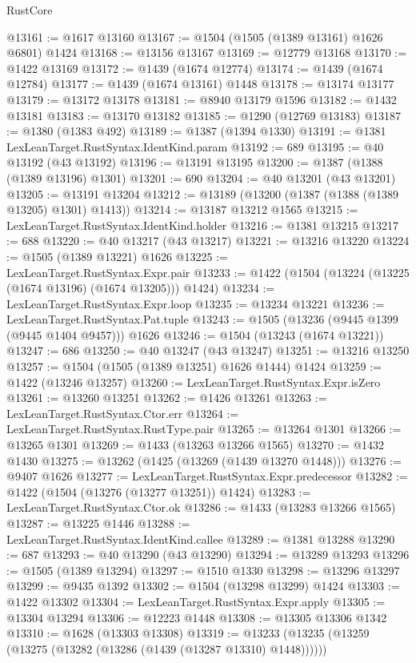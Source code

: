 \begin{lexlean}{RustCore}
\begin{coremodule}
@13161 := @1617 @13160
@13167 := @1504 (@1505 (@1389 @13161) @1626 @6801) @1424
@13168 := @13156 @13167
@13169 := @12779 @13168
@13170 := @1422 @13169
@13172 := @1439 (@1674 @12774)
@13174 := @1439 (@1674 @12784)
@13177 := @1439 (@1674 @13161) @1448
@13178 := @13174 @13177
@13179 := @13172 @13178
@13181 := @8940 @13179 @1596
@13182 := @1432 @13181
@13183 := @13170 @13182
@13185 := @1290 (@12769 @13183)
@13187 := @1380 (@1383 @492)
@13189 := @1387 (@1394 @1330)
@13191 := @1381 LexLeanTarget.RustSyntax.IdentKind.param
@13192 := 689
@13195 := @40 @13192 (@43 @13192)
@13196 := @13191 @13195
@13200 := @1387 (@1388 (@1389 @13196) @1301)
@13201 := 690
@13204 := @40 @13201 (@43 @13201)
@13205 := @13191 @13204
@13212 := @13189 (@13200 (@1387 (@1388 (@1389 @13205) @1301) @1413))
@13214 := @13187 @13212 @1565
@13215 := LexLeanTarget.RustSyntax.IdentKind.holder
@13216 := @1381 @13215
@13217 := 688
@13220 := @40 @13217 (@43 @13217)
@13221 := @13216 @13220
@13224 := @1505 (@1389 @13221) @1626
@13225 := LexLeanTarget.RustSyntax.Expr.pair
@13233 := @1422 (@1504 (@13224 (@13225 (@1674 @13196) (@1674 @13205))) @1424)
@13234 := LexLeanTarget.RustSyntax.Expr.loop
@13235 := @13234 @13221
@13236 := LexLeanTarget.RustSyntax.Pat.tuple
@13243 := @1505 (@13236 (@9445 @1399 (@9445 @1404 @9457))) @1626
@13246 := @1504 (@13243 (@1674 @13221))
@13247 := 686
@13250 := @40 @13247 (@43 @13247)
@13251 := @13216 @13250
@13257 := @1504 (@1505 (@1389 @13251) @1626 @1444) @1424
@13259 := @1422 (@13246 @13257)
@13260 := LexLeanTarget.RustSyntax.Expr.isZero
@13261 := @13260 @13251
@13262 := @1426 @13261
@13263 := LexLeanTarget.RustSyntax.Ctor.err
@13264 := LexLeanTarget.RustSyntax.RustType.pair
@13265 := @13264 @1301
@13266 := @13265 @1301
@13269 := @1433 (@13263 @13266 @1565)
@13270 := @1432 @1430
@13275 := @13262 (@1425 (@13269 (@1439 @13270 @1448)))
@13276 := @9407 @1626
@13277 := LexLeanTarget.RustSyntax.Expr.predecessor
@13282 := @1422 (@1504 (@13276 (@13277 @13251)) @1424)
@13283 := LexLeanTarget.RustSyntax.Ctor.ok
@13286 := @1433 (@13283 @13266 @1565)
@13287 := @13225 @1446
@13288 := LexLeanTarget.RustSyntax.IdentKind.callee
@13289 := @1381 @13288
@13290 := 687
@13293 := @40 @13290 (@43 @13290)
@13294 := @13289 @13293
@13296 := @1505 (@1389 @13294)
@13297 := @1510 @1330
@13298 := @13296 @13297
@13299 := @9435 @1392
@13302 := @1504 (@13298 @13299) @1424
@13303 := @1422 @13302
@13304 := LexLeanTarget.RustSyntax.Expr.apply
@13305 := @13304 @13294
@13306 := @12223 @1448
@13308 := @13305 @13306 @1342
@13310 := @1628 (@13303 @13308)
@13319 := @13233 (@13235 (@13259 (@13275 (@13282 (@13286 (@1439 (@13287 @13310) @1448))))))

\end{coremodule}
\end{lexlean}

